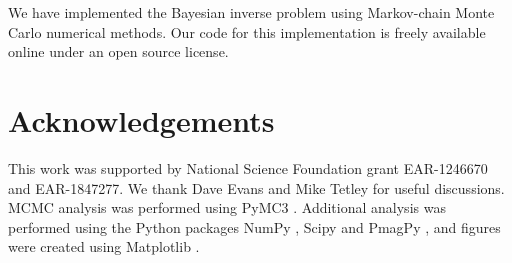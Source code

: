 \documentclass[11pt,letterpaper]{article}
\begin{document}
We have implemented the Bayesian inverse problem using Markov-chain Monte Carlo numerical methods. Our code for this implementation is freely available online under an open source license.




\section*{Acknowledgements}
\label{sec:acknowledgements}
This work was supported by National Science Foundation grant EAR-1246670 and EAR-1847277. We thank Dave Evans and Mike Tetley for useful discussions. MCMC analysis was performed using PyMC3 \citep{Salvatier2016a}. Additional analysis was performed using the Python packages NumPy \citep{Harris2020a}, Scipy \citep{Virtanen2020a} and PmagPy \citep{Tauxe2016a}, and figures were created using Matplotlib \citep{Hunter2007a}.

\clearpage
\newpage
\footnotesize

\singlespacing



\end{document}

